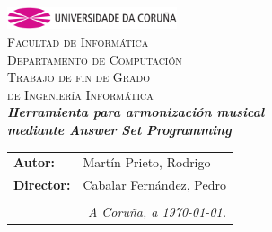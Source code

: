 \begin{titlepage}
\begin{center}
\includegraphics[width=5cm]{imagenes/anagramaUDC.png}\\[0.5cm]
{\textsc{Facultad de Informática}} \\
{\large \textsc{Departamento de Computación}} \\[1cm]
{\Large \textsc{Trabajo de fin de Grado}} \\
{\Large \textsc{de Ingeniería Informática}} \\[2cm]
{\Large \textsl{\textbf{Herramienta para armonización musical}}} \\[0.15cm]
{\Large \textsl{\textbf{mediante Answer Set Programming}}} \\
\vfill
\begin{flushright}
\begin{tabular}{ll}
\textbf{Autor:}    & Martín Prieto, Rodrigo \\
\textbf{Director:} & Cabalar Fernández, Pedro \\
& \\
\multicolumn{2}{r}{\small \emph{A Coruña, a \today{}.}} \\
\end{tabular}
\end{flushright}
\end{center}
\end{titlepage}
